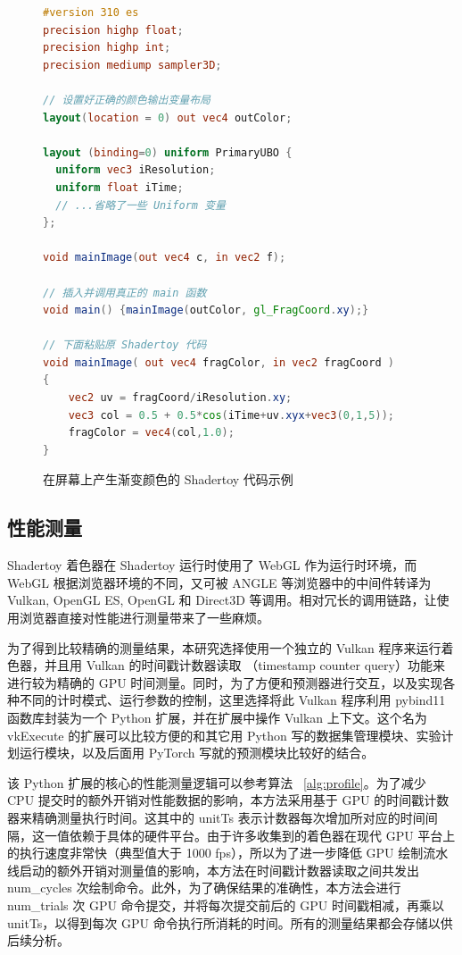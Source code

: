 \begin{figure}  %
\centering

\begin{lstlisting}[language=GLSL]
#version 310 es
precision highp float;
precision highp int;
precision mediump sampler3D;

// 设置好正确的颜色输出变量布局
layout(location = 0) out vec4 outColor;

layout (binding=0) uniform PrimaryUBO {
  uniform vec3 iResolution;
  uniform float iTime;
  // ...省略了一些 Uniform 变量
};

void mainImage(out vec4 c, in vec2 f);

// 插入并调用真正的 main 函数
void main() {mainImage(outColor, gl_FragCoord.xy);}

// 下面粘贴原 Shadertoy 代码
void mainImage( out vec4 fragColor, in vec2 fragCoord )
{
    vec2 uv = fragCoord/iResolution.xy;
    vec3 col = 0.5 + 0.5*cos(iTime+uv.xyx+vec3(0,1,5));
    fragColor = vec4(col,1.0);
}
\end{lstlisting}
\caption{在屏幕上产生渐变颜色的 Shadertoy 代码示例}
\label{fig:example_glsl_composed_code}
\end{figure}

\subsection{性能测量}
\label{sec:perf_measure}

Shadertoy 着色器在 Shadertoy 运行时使用了 WebGL 作为运行时环境，而 WebGL 根据浏览器环境的不同，又可被 ANGLE 等浏览器中的中间件转译为 Vulkan, OpenGL ES, OpenGL 和 Direct3D 等调用。相对冗长的调用链路，让使用浏览器直接对性能进行测量带来了一些麻烦。

为了得到比较精确的测量结果，本研究选择使用一个独立的 Vulkan 程序来运行着色器，并且用 Vulkan 的时间戳计数器读取 （timestamp counter query）功能来进行较为精确的 GPU 时间测量。同时，为了方便和预测器进行交互，以及实现各种不同的计时模式、运行参数的控制，这里选择将此 Vulkan 程序利用 pybind11 函数库封装为一个 Python 扩展，并在扩展中操作 Vulkan 上下文。这个名为 vkExecute 的扩展可以比较方便的和其它用 Python 写的数据集管理模块、实验计划运行模块，以及后面用 PyTorch 写就的预测模块比较好的结合。

该 Python 扩展的核心的性能测量逻辑可以参考算法 ~\ref{alg:profile}。为了减少 CPU 提交时的额外开销对性能数据的影响，本方法采用基于 GPU 的时间戳计数器来精确测量执行时间。这其中的 unitTs 表示计数器每次增加所对应的时间间隔，这一值依赖于具体的硬件平台。由于许多收集到的着色器在现代 GPU 平台上的执行速度非常快（典型值大于 1000 fps），所以为了进一步降低 GPU 绘制流水线启动的额外开销对测量值的影响，本方法在时间戳计数器读取之间共发出 num\_cycles 次绘制命令。此外，为了确保结果的准确性，本方法会进行 num\_trials 次 GPU 命令提交，并将每次提交前后的 GPU 时间戳相减，再乘以 unitTs，以得到每次 GPU 命令执行所消耗的时间。所有的测量结果都会存储以供后续分析。

